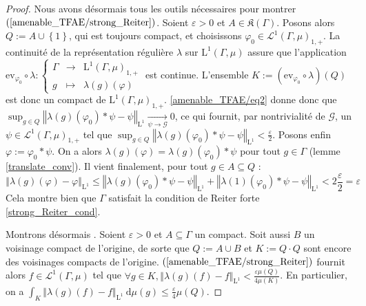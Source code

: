 \documentclass[a4paper,12pt]{article}
\newcommand{\ev}{\mathrm{ev}}
\newcommand{\norm}[1]{\left\Vert #1\right\Vert}
\newcommand{\halfilon}{{\frac\varepsilon2}}
\newcommand{\set}[1]{\left\{ #1 \right\}}
\newcommand{\integral}[4]{\int_{#1}^{#2} #3~\mathrm{d}#4}
\newcommand\fundef[3]{#1: \left\{\begin{array}{ccc}#2\\#3\end{array}\right.}
\newcommand{\comp}{\circ}
\renewcommand{\implies}{\Rightarrow}
\begin{document}
\begin{proof}
    Nous avons désormais tous les outils nécessaires pour montrer $(\ref{amenable_TFAE/strong_Reiter})$. Soient $\varepsilon>0$ et $A\in\mathfrak{K}(\Gamma)$.
    Posons alors $Q := A\cup\set{1}$, qui est toujours compact, et choisissons $\varphi_0\in\mathscr{L}^1(\Gamma, \mu)_{1, +}$. La continuité de la représentation régulière $\lambda$ sur 
    $\mathrm{L}^1(\Gamma, \mu)$ assure que l'application $\fundef{\ev_{\varphi_0}\comp\lambda}{\Gamma&\to&\mathrm{L}^1(\Gamma, \mu)_{1, +}}{g&\mapsto&\lambda(g)(\varphi)}$ est continue. 
    L'ensemble $K := (\ev_{\varphi_0}\comp\lambda)(Q)$ est donc un compact de $\mathrm{L}^1(\Gamma, \mu)_{1, +}$. \eqref{amenable_TFAE/eq2} donne donc 
    que $\sup_{g\in Q}\norm{\lambda(g)(\varphi_0)\ast\psi - \psi}_{\mathrm{L}^1} \xrightarrow[\psi\to\mathscr{G}]{} 0$, ce qui fournit, par nontrivialité 
    de $\mathscr{G}$, un $\psi\in\mathscr{L}^1(\Gamma, \mu)_{1, +}$ tel que $\sup_{g\in Q}\norm{\lambda(g)(\varphi_0)\ast\psi - \psi}_{\mathrm{L}^1} < \halfilon$. Posons enfin $\varphi := \varphi_0\ast\psi$.
    On a alors $\lambda(g)(\varphi) = \lambda(g)(\varphi_0)\ast\psi$ pour tout $g\in\Gamma$ (lemme \ref{translate_conv}). Il vient finalement, pour tout $g\in A\subseteq Q$ : 
    \begin{equation*}
        \norm{\lambda(g)(\varphi) - \varphi}_{\mathrm{L}^1} \leq    
            \norm{\lambda(g)(\varphi_0)\ast\psi - \psi}_{\mathrm{L}^1} + \norm{\lambda(1)(\varphi_0)\ast\psi - \psi}_{\mathrm{L}^1}
            < 2\halfilon = \varepsilon
    \end{equation*}
    Cela montre bien que $\Gamma$ satisfait la condition de Reiter forte \eqref{strong_Reiter_cond}.

    Montrons désormais \framebox{$(\ref{amenable_TFAE/strong_Reiter})\implies(\ref{amenable_TFAE/strong_Folner})$}. Soient $\varepsilon>0$
    et $A\subseteq\Gamma$ un compact. Soit aussi $B$ un voisinage compact de l'origine, de sorte que $Q := A\cup B$ et $K := Q\cdot Q$ sont encore des voisinages compacts de l'origine.
    $(\ref{amenable_TFAE/strong_Reiter})$ fournit alors $f\in\mathscr{L}^1(\Gamma, \mu)$ tel que $\forall g\in K, \norm{\lambda(g)(f) - f}_{\mathrm{L}^1} < \frac{\varepsilon\mu(Q)}{4\mu(K)}$.
    En particulier, on a $\integral{K}{}{\norm{\lambda(g)(f) - f}_{\mathrm{L}^1}}{\mu(g)} \leq \frac\varepsilon4\mu(Q)$.


\end{proof}
\end{document}

